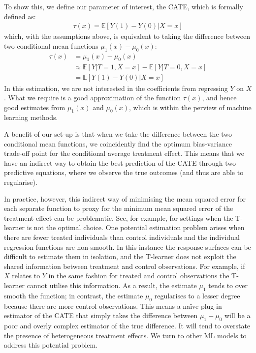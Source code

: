 \documentclass[12pt, a4paper]{article}
\begin{document}
To show this, we define our parameter of interest, the CATE, which is formally defined as:
\begin{align}
\tau (x) = \mathbb{E}[Y(1) - Y(0) | X{=}x]
\end{align}
which, with the assumptions above, is equivalent to taking the difference between two conditional mean functions $\mu _1(x) - \mu _0(x)$:
\begin{align}
\tau (x) & = \mu _1(x) - \mu _0(x) \nonumber \\
  & \approx \mathbb{E}[Y | T {=} 1, X {=} x] - \mathbb{E}[Y | T {=} 0, X {=} x] \nonumber \\
& = \mathbb{E}[Y(1) - Y(0) | X {=} x] \label{eq:indTE}
\end{align}
In this estimation, we are not interested in the coefficients from regressing
$Y$ on $X$. What we require is a good approximation of the function $\tau(x)$,
and hence good estimates from $\mu_1(x)$ and $\mu_0(x)$, which is within the
perview of machine learning methods.

A benefit of our set-up is that when we take the difference between the two conditional mean functions, we coincidently find the optimum bias-variance trade-off point for the conditional average treatment effect. This means that we have an indirect way to obtain the best prediction of the CATE through two predictive equations, where we observe the true outcomes (and thus are able to regularise).

In practice, however, this indirect way of minimising the mean squared error
for each separate function to proxy for the minimum mean squared error of the
treatment effect can be problematic. See, for example,
\cite{kunzel2019,kennedy2020} for settings when the T-learner is not the
optimal choice. One potential estimation problem arises when there are fewer
treated individuals than control individuals and the individual regression
functions are non-smooth. In this instance the response surfaces can be
difficult to estimate them in isolation, and the T-learner does not exploit the
shared information between treatment and control observations. For example, if
$X$ relates to $Y$ in the same fashion for treated and control observations the
T-learner cannot utilise this information. As a result, the estimate $\mu_1$
tends to over smooth the function; in contrast, the estimate $\mu_0$
regularises to a lesser degree because there are more control observations.
This means a na\"ive plug-in estimator of the CATE that simply takes the
difference between $\mu_1 - \mu_0$ will be a poor and overly complex estimator
of the true difference. It will tend to overstate the presence of heterogeneous
treatment effects. We turn to other ML models to address this potential
problem.
\end{document}
